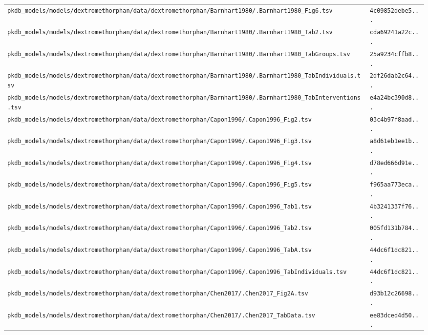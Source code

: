 \begin{longtable}{ll}
\texttt{pkdb\_models/models/dextromethorphan/data/dextromethorphan/Barnhart1980/.Barnhart1980\_Fig6.tsv} & \texttt{4c09852debe5...} \\
\texttt{pkdb\_models/models/dextromethorphan/data/dextromethorphan/Barnhart1980/.Barnhart1980\_Tab2.tsv} & \texttt{cda69241a22c...} \\
\texttt{pkdb\_models/models/dextromethorphan/data/dextromethorphan/Barnhart1980/.Barnhart1980\_TabGroups.tsv} & \texttt{25a9234cffb8...} \\
\texttt{pkdb\_models/models/dextromethorphan/data/dextromethorphan/Barnhart1980/.Barnhart1980\_TabIndividuals.tsv} & \texttt{2df26dab2c64...} \\
\texttt{pkdb\_models/models/dextromethorphan/data/dextromethorphan/Barnhart1980/.Barnhart1980\_TabInterventions.tsv} & \texttt{e4a24bc390d8...} \\
\texttt{pkdb\_models/models/dextromethorphan/data/dextromethorphan/Capon1996/.Capon1996\_Fig2.tsv} & \texttt{03c4b97f8aad...} \\
\texttt{pkdb\_models/models/dextromethorphan/data/dextromethorphan/Capon1996/.Capon1996\_Fig3.tsv} & \texttt{a8d61eb1ee1b...} \\
\texttt{pkdb\_models/models/dextromethorphan/data/dextromethorphan/Capon1996/.Capon1996\_Fig4.tsv} & \texttt{d78ed666d91e...} \\
\texttt{pkdb\_models/models/dextromethorphan/data/dextromethorphan/Capon1996/.Capon1996\_Fig5.tsv} & \texttt{f965aa773eca...} \\
\texttt{pkdb\_models/models/dextromethorphan/data/dextromethorphan/Capon1996/.Capon1996\_Tab1.tsv} & \texttt{4b3241337f76...} \\
\texttt{pkdb\_models/models/dextromethorphan/data/dextromethorphan/Capon1996/.Capon1996\_Tab2.tsv} & \texttt{005fd131b784...} \\
\texttt{pkdb\_models/models/dextromethorphan/data/dextromethorphan/Capon1996/.Capon1996\_TabA.tsv} & \texttt{44dc6f1dc821...} \\
\texttt{pkdb\_models/models/dextromethorphan/data/dextromethorphan/Capon1996/.Capon1996\_TabIndividuals.tsv} & \texttt{44dc6f1dc821...} \\
\texttt{pkdb\_models/models/dextromethorphan/data/dextromethorphan/Chen2017/.Chen2017\_Fig2A.tsv} & \texttt{d93b12c26698...} \\
\texttt{pkdb\_models/models/dextromethorphan/data/dextromethorphan/Chen2017/.Chen2017\_TabData.tsv} & \texttt{ee83dced4d50...} \\

\end{longtable}
